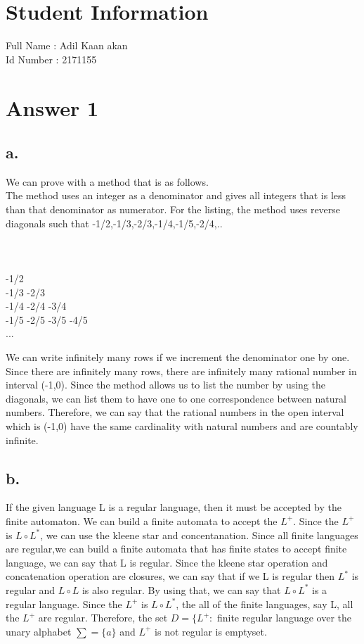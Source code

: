\documentclass[12pt]{article}
\begin{document}
\section*{Student Information } 
Full Name :  Adil Kaan akan \\
Id Number :  2171155 \\

\section*{Answer 1}

\subsection*{a.}
We can prove with a method that is as follows. \\
The method uses an integer as a denominator and gives all integers that is less than that denominator as numerator. For the listing, the method uses reverse diagonals such that -1/2,-1/3,-2/3,-1/4,-1/5,-2/4,..\\ \\ \\ \\
-1/2 \\
-1/3 -2/3 \\
-1/4 -2/4 -3/4 \\
-1/5 -2/5 -3/5 -4/5 \\
...


We can write infinitely many rows if we increment the denominator one by one. Since there are infinitely many rows, there are infinitely many rational number in interval (-1,0). Since the method allows us to list the number by using the diagonals, we can list them to have one to one correspondence between natural numbers. Therefore, we can say that the rational numbers in the open interval which is (-1,0) have the same cardinality with natural numbers and are countably infinite.



\subsection*{b.}
If the given language L is a regular language, then it must be accepted by the finite automaton. We can build a finite automata to accept the $L^+$. Since the $L^+$ is $L \circ L^*$, we can use the kleene star and concentanation. Since all finite languages are regular,we can build a finite automata that has finite states to accept finite language, we can say that L is regular. Since the kleene star operation and concatenation operation are closures, we can say that if we L is regular then $L^*$ is regular and $L \circ L$ is also regular. By using that, we can say that $L \circ L^*$ is a regular language. Since the $L^+$ is $L\circ L^*$, the all of the finite languages, say L, all the $L^+$ are regular. Therefore, the set $D = \{ L^+ :$ finite regular language over the unary alphabet $\sum = \{ a \}$ and $L^+$ is not regular is emptyset.
\end{document}
